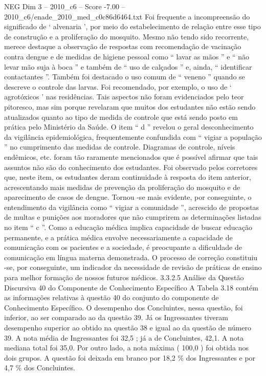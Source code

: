 \begin{textsample}{NEG Dim 3 – 2010\_c6 – Score -7.00 – 2010\_c6/enade\_2010\_med\_c0c86d6464.txt}
Foi frequente a incompreensão do significado de ‘ alvenaria ’, por meio do estabelecimento de relação entre esse tipo de construção e a proliferação do mosquito.
Mesmo não tendo sido recorrente, merece destaque a observação de respostas com recomendação de vacinação contra dengue e de medidas de higiene pessoal como “ lavar as mãos ” e “ não levar mão suja à boca ” e também de “ uso de calçados ” e, ainda, “ identificar contactantes ”.
Também foi destacado o uso comum de “ veneno ” quando se descreve o controle das larvas.
Foi recomendado, por exemplo, o uso de ‘ agrotóxicos ’ nas residências.
Tais aspectos não foram evidenciados pelo teor pitoresco, mas sim porque revelaram que muitos dos estudantes não estão sendo atualizados quanto ao tipo de medida de controle que está sendo posto em prática pelo Ministério da Saúde.
O item “ d ” revelou o geral desconhecimento da vigilância epidemiológica, frequentemente confundida com “ vigiar a população ” no cumprimento das medidas de controle.
Diagramas de controle, níveis endêmicos, etc. foram tão raramente mencionados que é possível afirmar que tais assuntos não são do conhecimento dos estudantes.
Foi observado pelos corretores que, neste item, os estudantes deram continuidade à resposta do item anterior, acrescentando mais medidas de prevenção da proliferação do mosquito e de aparecimento de casos de dengue.
Tornou -se mais evidente, por conseguinte, o entendimento da vigilância como “ vigiar a comunidade ”, acrescido de propostas de multas e punições aos moradores que não cumprirem as determinações listadas no item “ c ”.
Como a educação médica implica capacidade de buscar educação permanente, e a prática médica envolve necessariamente a capacidade de comunicação com os pacientes e a sociedade, é preocupante a dificuldade de comunicação em língua materna demonstrada.
O processo de correção constituiu -se, por conseguinte, um indicador da necessidade de revisão de práticas de ensino para melhor formação de nossos futuros médicos. 3.3.2.5 Análise da Questão Discursiva 40 do Componente de Conhecimento Específico A Tabela 3.18 contém as informações relativas à questão 40 do conjunto do componente de Conhecimento Específico.
O desempenho dos Concluintes, nessa questão, foi inferior, ao ser comparado ao da questão 39.
Já os Ingressantes tiveram desempenho superior ao obtido na questão 38 e igual ao da questão de número 39.
A nota média de Ingressantes foi 32,5 ; já a de Concluintes, 42,1.
A nota mediana total foi 35,0.
Por outro lado, a nota máxima ( 100,0 ) foi obtida nos dois grupos.
A questão foi deixada em branco por 18,2 \% dos Ingressantes e por 4,7 \% dos Concluintes.

\end{textsample}
